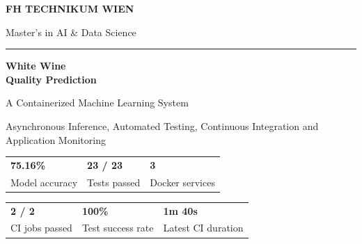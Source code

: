 \documentclass[11pt,a4paper]{article}
\begin{document}

\begin{titlepage}
\thispagestyle{empty}

\vspace*{8mm}

{\small\bfseries FH TECHNIKUM WIEN}\par

\vspace{3mm}

{\small Master's in AI \& Data Science}\par

\vspace{15mm}

\rule{40mm}{1pt}\par

\vspace{10mm}

{\fontsize{31}{36}\selectfont\bfseries
White Wine\\[3mm]
Quality Prediction\par}

\vspace{8mm}

{\large A Containerized Machine Learning System\par}

\vspace{4mm}

{\normalsize
Asynchronous Inference, Automated Testing,
Continuous Integration and Application Monitoring\par}

\vspace{16mm}

\begin{tabularx}{\linewidth}{@{}XXX@{}}
    \textbf{75.16\%} &
    \textbf{23 / 23} &
    \textbf{3}\\
    \small Model accuracy &
    \small Tests passed &
    \small Docker services
\end{tabularx}

\vspace{8mm}

\begin{tabularx}{\linewidth}{@{}XXX@{}}
    \textbf{2 / 2} &
    \textbf{100\%} &
    \textbf{1m 40s}\\
    \small CI jobs passed &
    \small Test success rate &
    \small Latest CI duration
\end{tabularx}


\end{titlepage}
\end{document}
